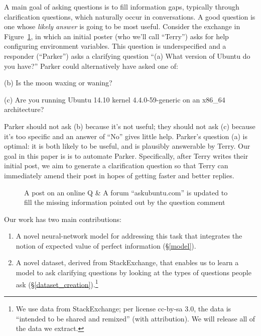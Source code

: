 \documentclass[11pt]{report}
\begin{document}
A main goal of asking questions is to fill information gaps, typically through clarification questions, which naturally occur in conversations. 
A good question is one whose \emph{likely answer} is going to be most useful.
Consider the exchange in Figure~\ref{askubuntu_post}, in which an initial poster (who we'll call ``Terry'') asks for help configuring environment variables.
This question is underspecified and a responder (``Parker'') asks a clarifying question ``\textsf{\small (a) What version of Ubuntu do you have?}''
Parker could alternatively have asked one of:

\textsf{\small(b) Is the moon waxing or waning?}

\textsf{\small(c) Are you running Ubuntu 14.10 kernel 4.4.0-59-generic on an x86\_64 architecture?}

\noindent
Parker should not ask (b) because it's not useful; they should not ask (c) because it's too specific and an answer of ``No'' gives little help.
Parker's question (a) is optimal: it is both likely to be useful, and is plausibly answerable by Terry.
Our goal in this paper is is to automate Parker.
Specifically, after Terry writes their initial post, we aim to generate a clarification question so that Terry can immediately amend their post in hopes of getting faster and better replies.
\begin{figure}[!t]
\centering
\setlength\fboxsep{1pt}
\setlength\fboxrule{0.5pt}
\caption{A post on an online Q \& A forum ``askubuntu.com'' is updated to fill the missing information pointed out by the question comment}
\label{askubuntu_post}
\end{figure}
%
Our work has two main contributions: 
\begin{enumerate}
\item A novel neural-network model for addressing this task that integrates the notion of expected value of perfect information (\S\ref{model}). %
\item A novel dataset, derived from StackExchange, that enables us to learn a model to ask clarifying questions by looking at the types of questions people ask (\S\ref{dataset_creation}).\footnote{We use data from StackExchange; per license cc-by-sa 3.0, the data is ``intended to be shared and remixed'' (with attribution). We will release all of the data we extract.}
\end{enumerate}
\end{document}
